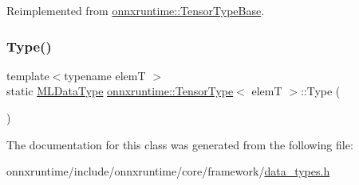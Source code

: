 Reimplemented from \mbox{\hyperlink{classonnxruntime_1_1TensorTypeBase_a4f3b2fcd0cd32a16607ef39bae0111af}{onnxruntime\+::\+Tensor\+Type\+Base}}.

\mbox{\label{classonnxruntime_1_1TensorType_a4c00722e54c14583892b2aa75e4568ce}} 
\subsubsection{\texorpdfstring{Type()}{Type()}}
{\footnotesize\ttfamily template$<$typename elemT $>$ \\
static \mbox{\hyperlink{namespaceonnxruntime_ad77d0a6e838ec7da5dc35fed5ee66b49}{M\+L\+Data\+Type}} \mbox{\hyperlink{classonnxruntime_1_1TensorType}{onnxruntime\+::\+Tensor\+Type}}$<$ elemT $>$\+::Type (\begin{DoxyParamCaption}{ }\end{DoxyParamCaption})\hspace{0.3cm}{\ttfamily [static]}}



The documentation for this class was generated from the following file\+:\begin{DoxyCompactItemize}
\item 
onnxruntime/include/onnxruntime/core/framework/\mbox{\hyperlink{data__types_8h}{data\+\_\+types.\+h}}\end{DoxyCompactItemize}

